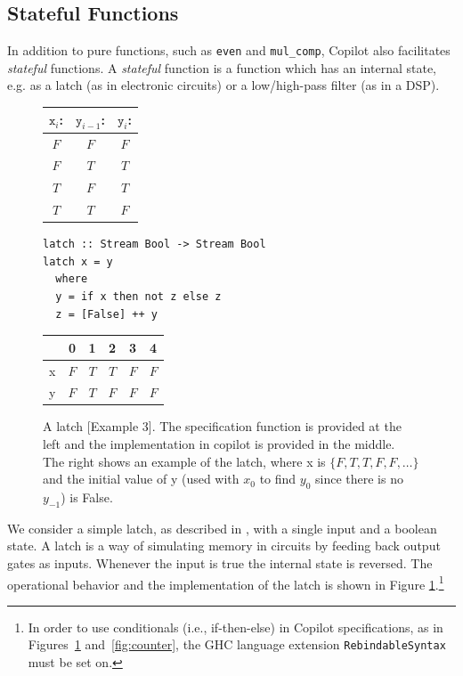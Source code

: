 \subsection{Stateful Functions} \label{sec:stateful}

In addition to pure functions, such as {\tt even} and {\tt mul\_comp},
Copilot also facilitates \emph{stateful} functions. A \emph{stateful} function
is a function which has an internal state, e.g. as a latch (as in electronic
circuits) or a low/high-pass filter (as in a DSP).

\begin{figure}
\begin{minipage}{0.25\linewidth}
\begin{tabular}{c|c||c}
$\mathtt{x}_i$: & $\mathtt{y}_{i-1}$: & $\mathtt{y}_i$:\\
\hline
$F$ & $F$ & $F$ \\
\hline
$F$ & $T$ & $T$ \\
\hline
$T$ & $F$ & $T$ \\
\hline
$T$ & $T$ & $F$
\end{tabular}
\end{minipage}
\begin{minipage}{0.35\linewidth}
\begin{lstlisting}[frame=none]
latch :: Stream Bool -> Stream Bool
latch x = y
  where
  y = if x then not z else z
  z = [False] ++ y
\end{lstlisting}
\end{minipage}
\hspace{1cm}
\begin{minipage}{0.3\linewidth}
\begin{tabular}{c|c|c|c|c|c}
   & 0 & 1 & 2 & 3 & 4\\
\hline
x & $F$ & $T$ & $T$ & $F$ & $F$ \\
\hline
y & $F$ & $T$ & $F$ & $F$ & $F$ \\ 
\end{tabular}
\end{minipage}
\caption{A latch [Example 3]. The specification function is provided at the left and the
implementation in copilot is provided in the middle. The right shows an example of 
the latch, where x is $\{F, T, T, F, F, \dots \}$ and the initial value of y (used with $x_0$ to find 
$y_0$ since there is no $y_{-1}$) is False.}
\label{fig:jk_latch}
\end{figure}

\begin{example}
We consider a simple latch, as described in \cite{Farhat2004}, with a single
input and a boolean state. A latch is a way of simulating memory in circuits by feeding
back output gates as inputs.  Whenever the input is true the internal state is reversed.
The operational behavior and the implementation of the latch is shown in Figure
\ref{fig:jk_latch}.\footnote
{In order
to use conditionals (i.e., if-then-else) in Copilot specifications,
as in Figures~\ref{fig:jk_latch} and~\ref{fig:counter}, the GHC
language extension {\tt RebindableSyntax} must be set on.}
\end{example}

